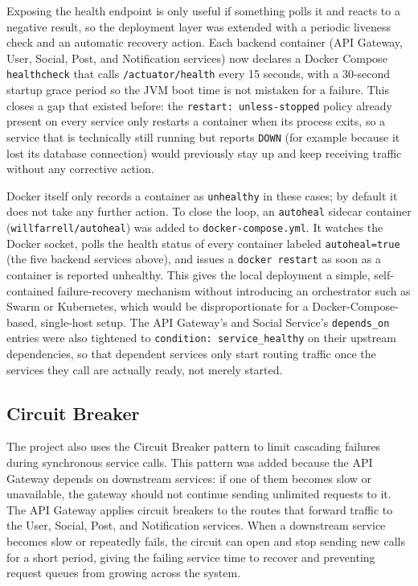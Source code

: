 \documentclass[12pt,a4paper]{article}
\begin{document}
Exposing the health endpoint is only useful if something polls it and reacts to a negative result, so the deployment layer was extended with a periodic liveness check and an automatic recovery action. Each backend container (API Gateway, User, Social, Post, and Notification services) now declares a Docker Compose \texttt{healthcheck} that calls \texttt{/actuator/health} every 15 seconds, with a 30-second startup grace period so the JVM boot time is not mistaken for a failure. This closes a gap that existed before: the \texttt{restart: unless-stopped} policy already present on every service only restarts a container when its process exits, so a service that is technically still running but reports \texttt{DOWN} (for example because it lost its database connection) would previously stay up and keep receiving traffic without any corrective action.

Docker itself only records a container as \texttt{unhealthy} in these cases; by default it does not take any further action. To close the loop, an \texttt{autoheal} sidecar container (\texttt{willfarrell/autoheal}) was added to \texttt{docker-compose.yml}. It watches the Docker socket, polls the health status of every container labeled \texttt{autoheal=true} (the five backend services above), and issues a \texttt{docker restart} as soon as a container is reported unhealthy. This gives the local deployment a simple, self-contained failure-recovery mechanism without introducing an orchestrator such as Swarm or Kubernetes, which would be disproportionate for a Docker-Compose-based, single-host setup. The API Gateway's and Social Service's \texttt{depends\_on} entries were also tightened to \texttt{condition: service\_healthy} on their upstream dependencies, so that dependent services only start routing traffic once the services they call are actually ready, not merely started.

\subsection{Circuit Breaker}

The project also uses the Circuit Breaker pattern to limit cascading failures during synchronous service calls. This pattern was added because the API Gateway depends on downstream services: if one of them becomes slow or unavailable, the gateway should not continue sending unlimited requests to it. The API Gateway applies circuit breakers to the routes that forward traffic to the User, Social, Post, and Notification services. When a downstream service becomes slow or repeatedly fails, the circuit can open and stop sending new calls for a short period, giving the failing service time to recover and preventing request queues from growing across the system.
\end{document}
